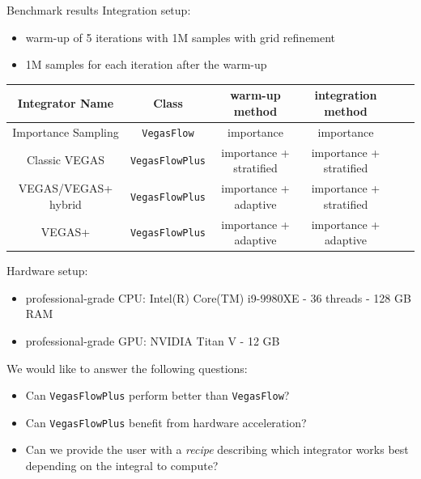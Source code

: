 \documentclass[t,handout,professionalfont,serif]{beamer}
\begin{document}
\begin{frame}{Benchmark results}
	\scriptsize
	Integration setup:
	\begin{itemize}
		\item warm-up of 5 iterations with 1M samples with grid refinement 
		\item 1M samples for each iteration after the warm-up 
	\end{itemize}
\tiny
	\begin{table}
		\centering
		\begin{tabular}{c| c| c| c | c | c   } 
			Integrator Name & Class & warm-up method& integration method  \\
			\hline
			Importance Sampling & \texttt{VegasFlow} & importance & importance \\ 
			Classic VEGAS & \texttt{VegasFlowPlus}& importance + stratified & importance + stratified \\
			VEGAS/VEGAS+ hybrid  & \texttt{VegasFlowPlus} & importance + adaptive & importance + stratified \\
			VEGAS+ & \texttt{VegasFlowPlus}& importance + adaptive & importance + adaptive \\ 
			\hline
			
		\end{tabular}
		\label{only table}
	\end{table}
\scriptsize

Hardware setup:
\begin{itemize}
	\item professional-grade CPU: Intel(R) Core(TM) i9-9980XE - 36 threads - 128 GB RAM
	\item professional-grade GPU: NVIDIA Titan V - 12 GB
\end{itemize}

\vspace{0.5cm}
We would like to answer the following questions:
\begin{itemize}
	\item Can \texttt{VegasFlowPlus} perform better than \texttt{VegasFlow}?
	\item Can \texttt{VegasFlowPlus} benefit from hardware acceleration?
	\item Can we provide the user with a \emph{recipe} describing which integrator works best depending on the integral to compute?
\end{itemize}	
	
\end{frame}
\end{document}
